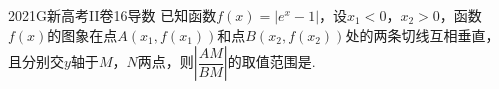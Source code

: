 
\begin{problem}{2021}{G}{新高考II卷}{16}{导数}
已知函数$f(x)=|e^x-1|$，设$x_1<0$，$x_2>0$，函数$f(x)$的图象在点$A(x_1,f(x_1))$和点$B(x_2,f(x_2))$处的两条切线互相垂直，且分别交$y$轴于$M$，$N$两点，则$\left|\dfrac{AM}{BM}\right|$的取值范围是\underline{\hspace{4em}}.
\end{problem}

\begin{answer}

\end{answer}

\begin{solutions}

\end{solutions}